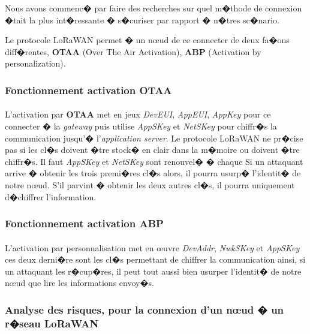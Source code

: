 \documentclass[a4paper, titlepage,12pt]{report}
\begin{document}
Nous avons commenc� par faire des recherches sur quel m�thode de connexion �tait la plus int�ressante � s�curiser par rapport � n�tres sc�nario. 

Le protocole LoRaWAN permet � un n\oe{}ud de ce connecter de deux fa�ons diff�rentes, \textbf{OTAA} (Over The Air Activation), \textbf{ABP} (Activation by personalization). 

\subsubsection{Fonctionnement activation OTAA}
\paragraph{}
L'activation par \textbf{OTAA} met en jeux \textit{DevEUI}, \textit{AppEUI}, \textit{AppKey}  pour ce connecter � la \textit{gateway} puis utilise \textit{AppSKey} et \textit{NetSKey} pour chiffr�s la communication jusqu'� l'\textit{application server}.
Le protocole LoRaWAN ne pr�cise pas si les cl�s doivent �tre stock� en clair dans la m�moire ou doivent �tre chiffr�s. Il faut \textit{AppSKey} et \textit{NetSKey} sont renouvel� � chaque 
Si un attaquant arrive � obtenir les trois premi�res cl�s alors, il pourra usurp� l'identit� de notre n\oe{}ud. S'il parvint � obtenir les deux autres cl�s, il pourra uniquement d�chiffrer l'information.

\subsubsection{Fonctionnement activation ABP}
\paragraph{}
L'activation par personnalisation met en \oe{}uvre \textit{DevAddr}, \textit{NwkSKey} et \textit{AppSKey} ces deux derni�re sont les cl�s permettant de chiffrer la communication ainsi, si un attaquant les r�cup�res, il peut tout aussi bien usurper l'identit� de notre n\oe{}ud que lire les informations envoy�s.

\subsubsection{Analyse des risques, pour la connexion d'un n\oe{}ud � un r�seau LoRaWAN}
\paragraph{}
\end{document}
